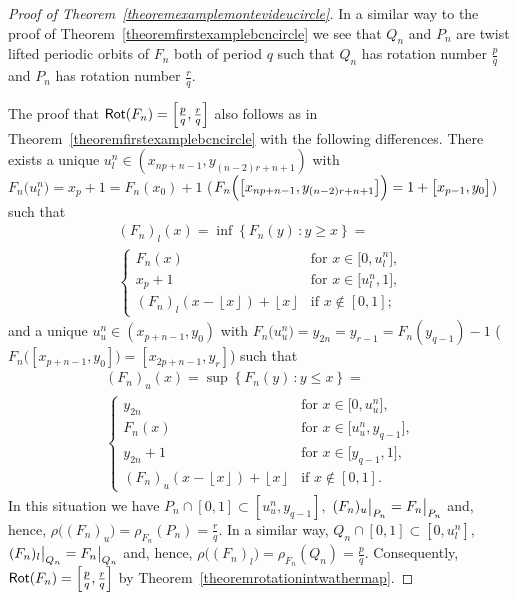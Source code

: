 \documentclass[a4paper, 11pt]{amsart}
\numberwithin{equation}{section}
\theoremstyle{customnumberedtheorem}
\theoremstyle{definitionwithbfnote}
\DeclareMathOperator{\Rot}{\textsf{\upshape Rot}}
\newcommand{\set}[2]{\ensuremath{\left\{#1 \,\colon #2\right\}}}
\newcommand{\floor}[1]{\ensuremath{\left\lfloor #1 \right\rfloor}}
\newcommand{\evalat}[1]{\bigr\rvert\sb{#1}}
\begin{document}
\begin{proof}[Proof of Theorem~\ref{theoremexamplemontevideucircle}]
In a similar way to the proof of Theorem~\ref{theoremfirstexamplebcncircle}
we see that $Q_n$ and $P_n$ are twist lifted periodic orbits of $F_n$
both of period $q$ such that
$Q_n$ has rotation number $\tfrac{p}{q}$ and
$P_n$ has rotation number $\tfrac{r}{q}.$

The proof that $\Rot(F_n) = \left[\tfrac{p}{q}, \tfrac{r}{q}\right]$
also follows as in Theorem~\ref{theoremfirstexamplebcncircle}
with the following differences. There exists a unique
$u^n_l \in (x_{np+n-1}, y_{(n-2)r+n+1})$
with $F_n\bigl(u^n_l\bigr) = x_p + 1 = F_n(x_0) + 1$
($F_n\Bigl(\bigl[x_{np+n-1}, y_{(n-2)r+n+1}\bigr]\Bigr) = 1 + \bigl[x_{p-1}, y_0\bigr]$)
such that
\begin{multline*}
 (F_n)_l(x) = \inf\set{F_n(y)}{y \ge x} = \\
 \begin{cases}
    F_n(x)& \text{for $x \in \bigl[0, u^n_l\bigr]$,}\\
    x_p+1 & \text{for $x \in \bigl[u^n_l,1\bigr]$,}\\
    (F_n)_l(x - \floor{x}) + \floor{x} & \text{if $x \notin [0,1];$}
 \end{cases}
\end{multline*}
and a unique $u^n_u \in (x_{p+n-1},y_0)$
with $F_n\bigl(u^n_u\bigr) = y_{2n} = y_{r-1} = F_n(y_{q-1}) - 1$
($F_n\bigl([x_{p+n-1},y_0]\bigr) = [x_{2p+n-1}, y_r]$)
such that\pagebreak[2]
\begin{multline*}
 (F_n)_u(x) = \sup\set{F_n(y)}{y \le x} = \\
 \begin{cases}
    y_{2n}   & \text{for $x \in \bigl[0, u^n_u\bigr]$,}\\
    F_n(x)   & \text{for $x \in \bigl[u^n_u,y_{q-1}\bigr]$,}\\
    y_{2n}+1 & \text{for $x \in \bigl[y_{q-1}, 1\bigr]$,}\\
    (F_n)_u(x - \floor{x}) + \floor{x} & \text{if $x \notin [0,1].$}
 \end{cases}
\end{multline*}
In this situation we have
$P_n \cap [0,1] \subset [u^n_u,y_{q-1}],$
$(F_n)_u\evalat{P_n} = F_n\evalat{P_n}$
and, hence,
$\rho\bigl((F_n)_u\bigr) = \rho_{F_n}(P_n) = \tfrac{r}{q}.$
In a similar way,
$Q_n \cap [0,1] \subset [0, u^n_l],$
$(F_n)_l\evalat{Q_n} = F_n\evalat{Q_n}$
and, hence,
$\rho\bigl((F_n)_l\bigr) = \rho_{F_n}(Q_n) = \tfrac{p}{q}.$
Consequently, $\Rot(F_n) = \left[\tfrac{p}{q}, \tfrac{r}{q}\right]$
by Theorem~\ref{theoremrotationintwathermap}.


\end{proof}
\end{document}
